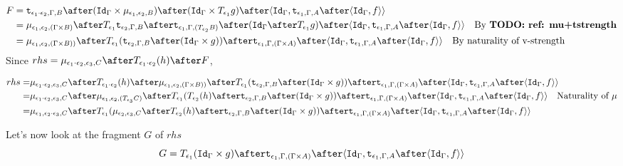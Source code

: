 {\begin{equation}
    \begin{split}
        F & = \tstrength{\e_1\dot\e_2}{\G}{B}\after(\idg\times\bind{\e_1}{\e_2}{B})\after(\idg\times\T{\e_1}{g})\after\pr{\idg}{\tstrength{\e_1}{\G}{A}\after\pr{\idg}{f}}\\
        &  = \bind{\e_1}{\e_2}{(\G\times B)} \after \T{\e_1}{\tstrength{\e_2}{\G}{B}} \after\tstrength{\e_1}{\G}{(\T{\e_2}{B})} \after (\idg \after\T{\e_1}{g})\after\pr{\idg}{\tstrength{\e_1}{\G}{A}\after\pr{\idg}{f}}\qt{By \todo{ref: mu+tstrength}}
        \\ & = \bind{\e_1}{\e_2}{(\G \times B))} \after \T{\e_1}{(\tstrength{\e_2}{\G}{B} \after (\idg \times g))} \after \tstrength{\e_1}{\G}{(\G \times A)} \after \pr{\idg}{\tstrength{\e_1}{\G}{A}\after\pr{\idg}{f}}\qt{By naturality of v-strength}
    \end{split}
\end{equation}
Since
$
    rhs = \bind{\e_1\dot\e_2}{\e_3}{C}\after\T{\e_1\dot\e_2}{(h)}\after F
$, 

\begin{equation}
    \begin{split}
        rhs = &\bind{\e_1\dot\e_2}{\e_3}{C}\after\T{\e_1\dot\e_2}{(h)}\after\bind{\e_1}{\e_2}{(\G \times B))} \after \T{\e_1}{(\tstrength{\e_2}{\G}{B} \after (\idg \times g))} \after \tstrength{\e_1}{\G}{(\G \times A)} \after \pr{\idg}{\tstrength{\e_1}{\G}{A}\after\pr{\idg}{f}}\\
        = &\bind{\e_1\dot\e_2}{\e_3}{C}\after\bind{\e_1}{\e_2}{(\T{\e_3}{C})}\after\T{\e_1}{(\T{\e_2}{(h)} \after \tstrength{\e_2}{\G}{B} \after (\idg \times g))} \after \tstrength{\e_1}{\G}{(\G \times A)} \after \pr{\idg}{\tstrength{\e_1}{\G}{A}\after\pr{\idg}{f}}\qt{Naturality of $\mu$}\\
        = & \bind{\e_1}{\e_2\dot\e_3}{C}\after\T{\e_1}{(\bind{\e_2}{\e_3}{C}\after \T{\e_2}{(h)} \after \tstrength{\e_2}{\G}{B} \after (\idg \times g))} \after \tstrength{\e_1}{\G}{(\G \times A)} \after \pr{\idg}{\tstrength{\e_1}{\G}{A}\after\pr{\idg}{f}}
    \end{split}
\end{equation}

Let's now look at the fragment $G$ of $rhs$
\begin{equation}
    G = \T{\e_1}{(\idg\times g)}\after\tstrength{\e_1}{\G}{(\G\times A)}\after\pr{\idg}{\tstrength{\e_1}{\G}{A}\after\pr{\idg}{f}}
\end{equation}

}
